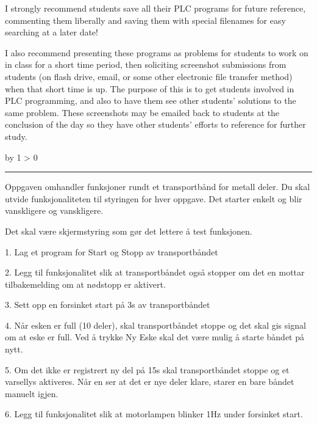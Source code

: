\documentclass[12pt,a4paper]{article}
\def\oppgave{
            \advance\questnum by 1
            \ifnum \questnum > 0
                 \hrule
                 \vskip 3pt
                 \leftline{Oppgave \the\questnum}
                 \vskip 3pt \fi}
\begin{document}
I strongly recommend students save all their PLC programs for future reference, commenting them liberally and saving them with special filenames for easy searching at a later date!

\vskip 10pt

I also recommend presenting these programs as problems for students to work on in class for a short time period, then soliciting screenshot submissions from students (on flash drive, email, or some other electronic file transfer method) when that short time is up.  The purpose of this is to get students involved in PLC programming, and also to have them see other students' solutions to the same problem.  These screenshots may be emailed back to students at the conclusion of the day so they have other students' efforts to reference for further study.



\vfil \eject 



\oppgave{} 


Oppgaven omhandler funksjoner rundt et transportbånd for metall deler.
Du skal utvide funksjonaliteten til styringen for hver oppgave. Det
starter enkelt og blir vanskligere og vanskligere. 


Det skal være skjermstyring som gør det lettere å test funksjonen. 

1. Lag et program for Start og Stopp av transportbåndet 

2. Legg til funksjonalitet slik at transportbåndet også stopper om
det en mottar tilbakemelding om at nødstopp er aktivert. 

3. Sett opp en forsinket start på 3s av transportbåndet 

4. Når esken er full (10 deler), skal transportbåndet stoppe og det
skal gis signal om at eske er full. Ved å trykke Ny Eske skal det
være mulig å starte båndet på nytt. 

5. Om det ikke er registrert ny del på 15s skal transportbåndet stoppe
og et varsellys aktiveres. Når en ser at det er nye deler klare, starer
en bare båndet manuelt igjen. 

6. Legg til funksjonalitet slik at motorlampen blinker 1Hz under forsinket
start. 
\end{document}
